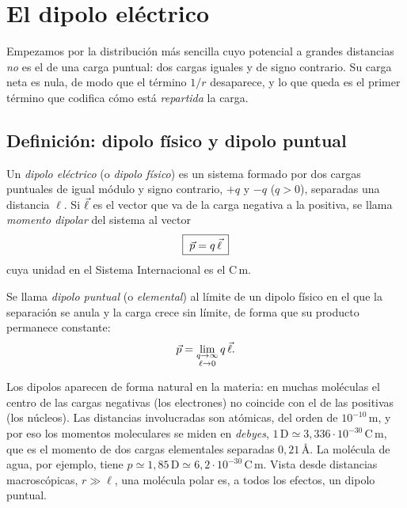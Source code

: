 \section{El dipolo eléctrico}\label{sec:dipolo}
Empezamos por la distribución más sencilla cuyo potencial a grandes distancias \emph{no} es el de una carga puntual: dos cargas
iguales y de signo contrario. Su carga neta es nula, de modo que el término $1/r$ desaparece, y lo que queda es el primer término
que codifica cómo está \emph{repartida} la carga.

\subsection{Definición: dipolo físico y dipolo puntual}\label{sec:dipolo-def}
\begin{definicion}\label{def:dipolo}
Un \emph{dipolo eléctrico} (o \emph{dipolo físico}) es un sistema formado por dos cargas puntuales de igual módulo y signo contrario,
$+q$ y $-q$ ($q>0$), separadas una distancia $\ell$. Si $\vec{\ell}$ es el vector que va de la carga negativa a la positiva, se llama
\emph{momento dipolar} del sistema al vector
\begin{equation}\label{eq:momento-dipolar}
  \boxed{\;\vec{p}=q\,\vec{\ell}\;}
\end{equation}
cuya unidad en el Sistema Internacional es el $\mathrm{C\,m}$.
\end{definicion}

\begin{definicion}\label{def:dipolo-puntual}
Se llama \emph{dipolo puntual} (o \emph{elemental}) al límite de un dipolo físico en el que la separación se anula y la carga crece
sin límite, de forma que su producto permanece constante:
\begin{equation}\label{eq:dipolo-puntual}
  \vec{p}=\lim_{\substack{q\to\infty\\ \ell\to0}}q\,\vec{\ell} .
\end{equation}
\end{definicion}

\begin{observacion}\label{obs:debye}
Los dipolos aparecen de forma natural en la materia: en muchas moléculas el centro de las cargas negativas (los electrones) no coincide con
el de las positivas (los núcleos). Las distancias involucradas son atómicas, del orden de $10^{-10}\,\mathrm{m}$, y por eso los momentos
moleculares se miden en \emph{debyes}, $1\,\mathrm{D}\simeq3{,}336\cdot10^{-30}\,\mathrm{C\,m}$, que es el momento de dos cargas elementales
separadas $0{,}21\,\text{\AA}$. La molécula de agua, por ejemplo, tiene $p\simeq1{,}85\,\mathrm{D}\simeq6{,}2\cdot10^{-30}\,\mathrm{C\,m}$. Vista
desde distancias macroscópicas, $r\gg\ell$, una molécula polar es, a todos los efectos, un dipolo puntual.
\end{observacion}

